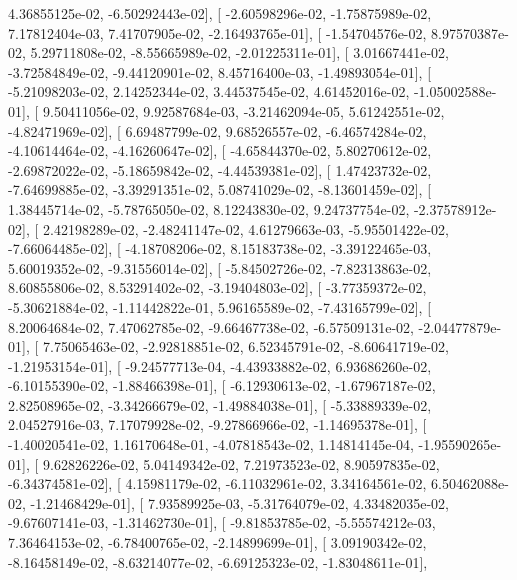 \documentclass{article}
\begin{document}
          4.36855125e-02,  -6.50292443e-02],
       [ -2.60598296e-02,  -1.75875989e-02,   7.17812404e-03,
          7.41707905e-02,  -2.16493765e-01],
       [ -1.54704576e-02,   8.97570387e-02,   5.29711808e-02,
         -8.55665989e-02,  -2.01225311e-01],
       [  3.01667441e-02,  -3.72584849e-02,  -9.44120901e-02,
          8.45716400e-03,  -1.49893054e-01],
       [ -5.21098203e-02,   2.14252344e-02,   3.44537545e-02,
          4.61452016e-02,  -1.05002588e-01],
       [  9.50411056e-02,   9.92587684e-03,  -3.21462094e-05,
          5.61242551e-02,  -4.82471969e-02],
       [  6.69487799e-02,   9.68526557e-02,  -6.46574284e-02,
         -4.10614464e-02,  -4.16260647e-02],
       [ -4.65844370e-02,   5.80270612e-02,  -2.69872022e-02,
         -5.18659842e-02,  -4.44539381e-02],
       [  1.47423732e-02,  -7.64699885e-02,  -3.39291351e-02,
          5.08741029e-02,  -8.13601459e-02],
       [  1.38445714e-02,  -5.78765050e-02,   8.12243830e-02,
          9.24737754e-02,  -2.37578912e-02],
       [  2.42198289e-02,  -2.48241147e-02,   4.61279663e-03,
         -5.95501422e-02,  -7.66064485e-02],
       [ -4.18708206e-02,   8.15183738e-02,  -3.39122465e-03,
          5.60019352e-02,  -9.31556014e-02],
       [ -5.84502726e-02,  -7.82313863e-02,   8.60855806e-02,
          8.53291402e-02,  -3.19404803e-02],
       [ -3.77359372e-02,  -5.30621884e-02,  -1.11442822e-01,
          5.96165589e-02,  -7.43165799e-02],
       [  8.20064684e-02,   7.47062785e-02,  -9.66467738e-02,
         -6.57509131e-02,  -2.04477879e-01],
       [  7.75065463e-02,  -2.92818851e-02,   6.52345791e-02,
         -8.60641719e-02,  -1.21953154e-01],
       [ -9.24577713e-04,  -4.43933882e-02,   6.93686260e-02,
         -6.10155390e-02,  -1.88466398e-01],
       [ -6.12930613e-02,  -1.67967187e-02,   2.82508965e-02,
         -3.34266679e-02,  -1.49884038e-01],
       [ -5.33889339e-02,   2.04527916e-03,   7.17079928e-02,
         -9.27866966e-02,  -1.14695378e-01],
       [ -1.40020541e-02,   1.16170648e-01,  -4.07818543e-02,
          1.14814145e-04,  -1.95590265e-01],
       [  9.62826226e-02,   5.04149342e-02,   7.21973523e-02,
          8.90597835e-02,  -6.34374581e-02],
       [  4.15981179e-02,  -6.11032961e-02,   3.34164561e-02,
          6.50462088e-02,  -1.21468429e-01],
       [  7.93589925e-03,  -5.31764079e-02,   4.33482035e-02,
         -9.67607141e-03,  -1.31462730e-01],
       [ -9.81853785e-02,  -5.55574212e-03,   7.36464153e-02,
         -6.78400765e-02,  -2.14899699e-01],
       [  3.09190342e-02,  -8.16458149e-02,  -8.63214077e-02,
         -6.69125323e-02,  -1.83048611e-01],
\end{document}
